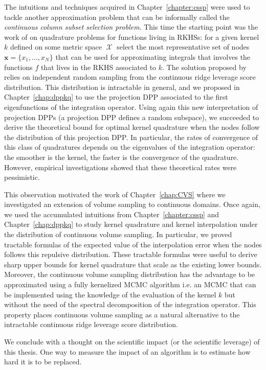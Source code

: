 \documentclass[twoside,11pt]{book}
\numberwithin{theorem}{chapter}
\numberwithin{definition}{chapter}
\numberwithin{proposition}{chapter}
\numberwithin{corollary}{chapter}
\numberwithin{example}{chapter}
\numberwithin{lemma}{chapter}
\numberwithin{assumption}{chapter}
\numberwithin{equation}{chapter}
\numberwithin{figure}{chapter}
\DeclareMathOperator{\X}{\mathcal{X}}
\begin{document}
The intuitions and techniques acquired in Chapter~\ref{chapter:cssp} were used to tackle another approximation problem that can be informally called the \emph{ continuous column subset selection problem}. This time the starting point was the work of \cite{Bac17} on quadrature problems for functions living in RKHSs: for a given kernel $k$ defined on some metric space $\X$ select the most representative set of nodes $\bm{x} = \{x_{1}, \dots, x_{N} \}$ that can be used for approximating integrals that involves the functions $f$ that lives in the RKHS associated to $k$. The solution proposed by \cite{Bac17} relies on independent random sampling from the continuous ridge leverage score distribution. This distribution is intractable in general, and we proposed in Chapter~\ref{chap:dppkq} to use the projection DPP associated to the first eigenfunctions of the integration operator. Using again this new interpretation of projection DPPs (a projection DPP defines a random subspace), we succeeded to derive the theoretical bound for optimal kernel quadrature when the nodes follow the distribution of this projection DPP.
In particular, the rates of convergence of this class of quadratures depends on the eigenvalues of the integration operator: the smoother is the kernel, the faster is the convergence of the quadrature. However, empirical investigations showed that these theoretical rates were pessimistic. 

This observation motivated the work of Chapter~\ref{chap:CVS} where we investigated an extension of  volume sampling to continuous domains. Once again, we used the accumulated intuitions from Chapter~\ref{chapter:cssp} and Chapter~\ref{chap:dppkq} to study kernel quadrature and kernel interpolation under the distribution of continuous volume sampling. In particular, we proved tractable formulas of the expected value of the interpolation error when the nodes follows this repulsive distribution. These tractable formulas were useful to derive sharp upper bounds for kernel quadrature that scale as the existing lower bounds. Moreover, the continuous volume sampling distribution has the advantage to be approximated using a fully kernelized MCMC algorithm i.e. an MCMC that can be implemented using the knowledge of the evaluation of the kernel $k$ but without the need of the spectral decomposition of the integration operator. This property places continuous volume sampling as a natural alternative to the intractable continuous ridge leverage score distribution.

We conclude with a thought on the scientific impact (or the scientific leverage) of this thesis.
One way to measure the impact of an algorithm is to estimate how hard it is to be replaced.
\end{document}
